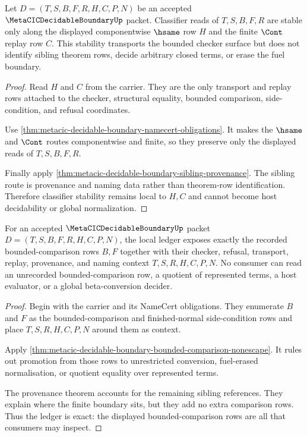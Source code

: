 \begin{theorem}
\label{thm:metacic-decidable-boundary-classifier-stability}
Let $D=(T,S,B,F,R,H,C,P,N)$ be an accepted $\MetaCICDecidableBoundaryUp$ packet. Classifier reads of $T,S,B,F,R$ are stable only along the displayed componentwise $\hsame$ row $H$ and the finite $\Cont$ replay row $C$. This stability transports the bounded checker surface but does not identify sibling theorem rows, decide arbitrary closed terms, or erase the fuel boundary.
\end{theorem}
\begin{proof}
Read $H$ and $C$ from the carrier. They are the only transport and replay rows attached to the checker, structural equality, bounded comparison, side-condition, and refusal coordinates.

Use \autoref{thm:metacic-decidable-boundary-namecert-obligations}. It makes the $\hsame$ and $\Cont$ routes componentwise and finite, so they preserve only the displayed reads of $T,S,B,F,R$.

Finally apply \autoref{thm:metacic-decidable-boundary-sibling-provenance}. The sibling route is provenance and naming data rather than theorem-row identification. Therefore classifier stability remains local to $H,C$ and cannot become host decidability or global normalization.
\end{proof}

\begin{theorem}
\label{thm:metacic-decidable-boundary-ledger-exactness}
For an accepted $\MetaCICDecidableBoundaryUp$ packet $D=(T,S,B,F,R,H,C,P,N)$, the local ledger exposes exactly the recorded bounded-comparison rows $B,F$ together with their checker, refusal, transport, replay, provenance, and naming context $T,S,R,H,C,P,N$. No consumer can read an unrecorded bounded-comparison row, a quotient of represented terms, a host evaluator, or a global beta-conversion decider.
\end{theorem}
\begin{proof}
Begin with the carrier and its NameCert obligations. They enumerate $B$ and $F$ as the bounded-comparison and finished-normal side-condition rows and place $T,S,R,H,C,P,N$ around them as context.

Apply \autoref{thm:metacic-decidable-boundary-bounded-comparison-nonescape}. It rules out promotion from those rows to unrestricted conversion, fuel-erased normalisation, or quotient equality over represented terms.

The provenance theorem accounts for the remaining sibling references. They explain where the finite boundary sits, but they add no extra comparison rows. Thus the ledger is exact: the displayed bounded-comparison rows are all that consumers may inspect.
\end{proof}


